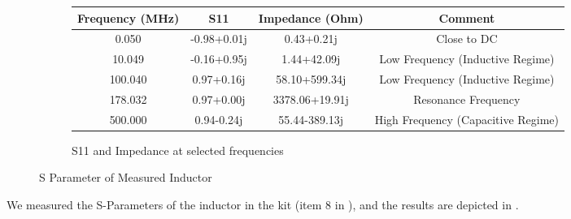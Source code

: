 \documentclass{article}
\begin{document}
\begin{figure}[h]
    \begin{subfigure}{\linewidth}
        \centering
        \begin{tabular}{ |c|c|c| c|}
            \hline
            Frequency (MHz) & S11         & Impedance (Ohm) & Comment
            \\\hline
            0.050           & -0.98+0.01j & 0.43+0.21j      & Close to DC
            \\\hline
            10.049          & -0.16+0.95j & 1.44+42.09j     & Low Frequency (Inductive Regime)
            \\\hline
            100.040         & 0.97+0.16j  & 58.10+599.34j   & Low Frequency (Inductive Regime)
            \\\hline
            178.032         & 0.97+0.00j  & 3378.06+19.91j  & Resonance Frequency
            \\\hline
            500.000         & 0.94-0.24j  & 55.44-389.13j   & High Frequency (Capacitive Regime)
            \\\hline
        \end{tabular}
        \caption{S11 and Impedance at selected frequencies}
        \label{tab:inductor_meas}
    \end{subfigure}

    \caption{S Parameter of Measured Inductor}
    \label{fig:inductor_meas}
\end{figure}

We measured the S-Parameters of the inductor in the kit (item 8 in ), and the results are depicted in .
\end{document}
